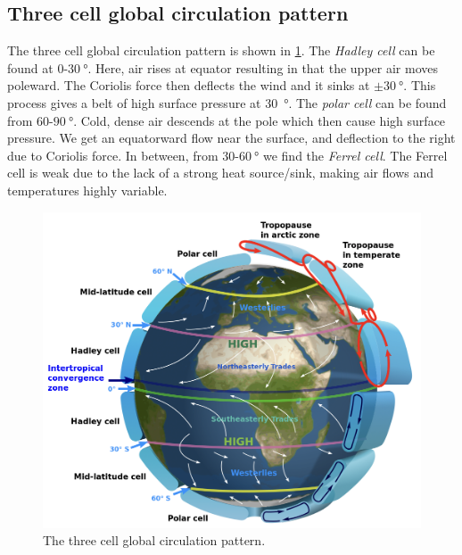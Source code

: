 \subsection{Three cell global circulation pattern}
The three cell global circulation pattern is shown in \cref{fig:L6_three_cell_circulation}. The \emph{Hadley cell} can be found at \(0\)-\(\SI{30}{\degree}\). Here, air rises at equator resulting in that the upper air moves poleward. The Coriolis force then deflects the wind and it sinks at \(\pm\SI{30}{\degree}\). This process gives a belt of high surface pressure at \SI{30}{\degree}. The \emph{polar cell} can be found from \(60\)-\(\SI{90}{\degree}\). Cold, dense air descends at the pole which then cause high surface pressure. We get an equatorward flow near the surface, and deflection to the right due to Coriolis force. In between, from \(30\)-\(\SI{60}{\degree}\) we find the \emph{Ferrel cell}. The Ferrel cell is weak due to the lack of a strong heat source/sink, making air flows and temperatures highly variable.
\begin{figure}[t]
    \centering
    \includegraphics[width=.65\linewidth]{bilder/L6_three_cell_circulation.png}
    \caption{The three cell global circulation pattern.}\label{fig:L6_three_cell_circulation}
\end{figure}

